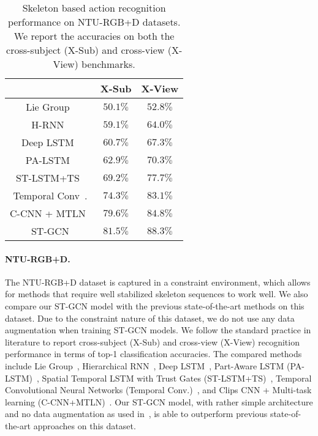\documentclass[letterpaper]{article} \usepackage{aaai18}  \usepackage{times}  \usepackage{helvet}  \usepackage{courier}  \usepackage{url}  \usepackage{graphicx}
\begin{document}
\begin{table}
	\small
	\centering
	\begin{tabular}{c|c|c}\hline
		& X-Sub& X-View \\ \hline
		Lie Group~\cite{Veeriah2015CVPR}		& $ 50.1 \% $ & $ 52.8 \% $ \\
		H-RNN~\cite{Du2015CVPR}		& $ 59.1 \% $& $ 64.0 \% $ \\
		Deep LSTM~\cite{Shahroudy2016CVPR}		& $ 60.7 \% $& $ 67.3 \% $ \\
		PA-LSTM~\cite{Shahroudy2016CVPR}			& $ 62.9 \% $& $ 70.3 \% $ \\
		ST-LSTM+TS~\cite{Liu2016ECCV}		& $ 69.2 \% $& $ 77.7 \% $ \\
		Temporal Conv~\cite{Kim2017CVPRW}.		& $ 74.3 \% $ & $ 83.1 \% $ \\
		C-CNN + MTLN~\cite{Ke2017CVPR}		& $ 79.6 \% $& $ 84.8 \% $ \\
		\hline
		ST-GCN 			& $\mathbf{81.5\%} $ & $ \mathbf{88.3\%} $ \\\hline
	\end{tabular}
	\caption{Skeleton based action recognition performance on NTU-RGB+D datasets. We report the accuracies on both the cross-subject (X-Sub) and cross-view (X-View) benchmarks.}\label{tab:ntu}
\end{table}

\paragraph{NTU-RGB+D.}
The NTU-RGB+D dataset is captured in a constraint environment, which allows for methods that require well stabilized skeleton sequences to work well.
We also compare our ST-GCN model with the previous state-of-the-art methods on this dataset.
Due to the constraint nature of this dataset, we do not use any data augmentation when training ST-GCN models.
We follow the standard practice in literature to report cross-subject (X-Sub) and cross-view (X-View) recognition performance in terms of top-1 classification accuracies.
The compared methods include Lie Group~\cite{Veeriah2015CVPR}, Hierarchical RNN~\cite{Du2015CVPR}, Deep LSTM~\cite{Shahroudy2016CVPR}, Part-Aware LSTM (PA-LSTM)~\cite{Shahroudy2016CVPR}, Spatial Temporal LSTM with Trust Gates (ST-LSTM+TS)~\cite{Liu2016ECCV}, Temporal Convolutional Neural Networks (Temporal Conv.)~\cite{Kim2017CVPRW}, and Clips CNN + Multi-task learning (C-CNN+MTLN)~\cite{Ke2017CVPR}.
Our ST-GCN model, with rather simple architecture and no data augmentation as used in~\cite{Kim2017CVPRW,Ke2017CVPR}, is able to outperform previous state-of-the-art approaches on this dataset.
\end{document}
